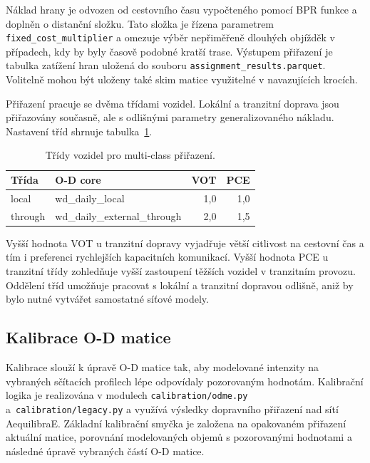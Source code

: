 Náklad hrany je odvozen od cestovního času vypočteného pomocí BPR funkce a doplněn o distanční složku. Tato složka je řízena parametrem \texttt{fixed\_cost\_multiplier} a omezuje výběr nepřiměřeně dlouhých objížděk v případech, kdy by byly časově podobné kratší trase. Výstupem přiřazení je tabulka zatížení hran uložená do souboru \texttt{assignment\_results.parquet}. Volitelně mohou být uloženy také skim matice využitelné v navazujících krocích.

Přiřazení pracuje se dvěma třídami vozidel. Lokální a tranzitní doprava jsou přiřazovány současně, ale s odlišnými parametry generalizovaného nákladu. Nastavení tříd shrnuje tabulka~\ref{tab:multi-class}.

\begin{table}[ht]
\centering
\label{tab:multi-class}
\begin{tabular}{llrr}
\toprule
\textbf{Třída} & \textbf{O-D core} & \textbf{VOT} & \textbf{PCE} \\
\midrule
local   & wd\_daily\_local            & 1,0 & 1,0 \\
through & wd\_daily\_external\_through & 2,0 & 1,5 \\
\bottomrule
\end{tabular}
\caption{Třídy vozidel pro multi-class přiřazení.}
\end{table}

Vyšší hodnota VOT u tranzitní dopravy vyjadřuje větší citlivost na cestovní čas a tím i preferenci rychlejších kapacitních komunikací. Vyšší hodnota PCE u tranzitní třídy zohledňuje vyšší zastoupení těžších vozidel v tranzitním provozu. Oddělení tříd umožňuje pracovat s lokální a tranzitní dopravou odlišně, aniž by bylo nutné vytvářet samostatné síťové modely.

\subsection{Kalibrace O-D matice}
\label{sec:impl-calibration-odme}

Kalibrace slouží k úpravě O-D matice tak, aby modelované intenzity na vybraných sčítacích profilech lépe odpovídaly pozorovaným hodnotám. Kalibrační logika je realizována v modulech \texttt{calibration/odme.py} a~\texttt{calibration/legacy.py} a využívá výsledky dopravního přiřazení nad sítí AequilibraE. Základní kalibrační smyčka je založena na opakovaném přiřazení aktuální matice, porovnání modelovaných objemů s pozorovanými hodnotami a následné úpravě vybraných částí O-D matice.

